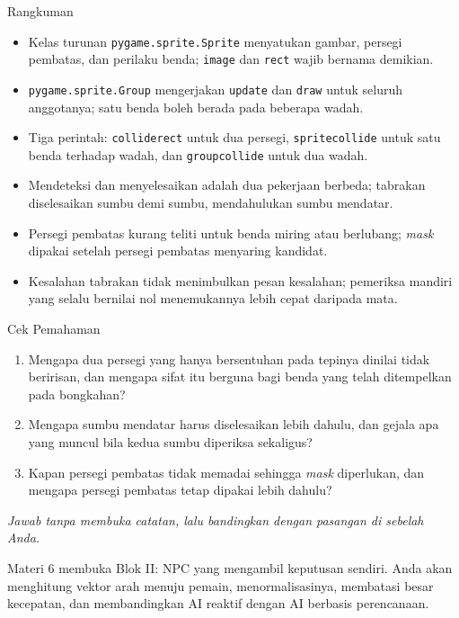 \documentclass[aspectratio=169,10pt]{beamer}
\begin{document}
\begin{frame}{Rangkuman}
\begin{itemize}
  \item Kelas turunan \texttt{pygame.sprite.Sprite} menyatukan gambar, persegi
        pembatas, dan perilaku benda; \texttt{image} dan \texttt{rect} wajib
        bernama demikian.
  \item \texttt{pygame.sprite.Group} mengerjakan \texttt{update} dan
        \texttt{draw} untuk seluruh anggotanya; satu benda boleh berada pada
        beberapa wadah.
  \item Tiga perintah: \texttt{colliderect} untuk dua persegi,
        \texttt{spritecollide} untuk satu benda terhadap wadah, dan
        \texttt{groupcollide} untuk dua wadah.
  \item Mendeteksi dan menyelesaikan adalah dua pekerjaan berbeda; tabrakan
        diselesaikan sumbu demi sumbu, mendahulukan sumbu mendatar.
  \item Persegi pembatas kurang teliti untuk benda miring atau berlubang;
        \emph{mask} dipakai setelah persegi pembatas menyaring kandidat.
  \item Kesalahan tabrakan tidak menimbulkan pesan kesalahan; pemeriksa mandiri
        yang selalu bernilai nol menemukannya lebih cepat daripada mata.
\end{itemize}
\end{frame}

\begin{frame}{Cek Pemahaman}
\begin{enumerate}
  \item Mengapa dua persegi yang hanya bersentuhan pada tepinya dinilai tidak
        beririsan, dan mengapa sifat itu berguna bagi benda yang telah
        ditempelkan pada bongkahan?
  \item Mengapa sumbu mendatar harus diselesaikan lebih dahulu, dan gejala apa
       yang muncul bila kedua sumbu diperiksa sekaligus?
  \item Kapan persegi pembatas tidak memadai sehingga \emph{mask} diperlukan,
        dan mengapa persegi pembatas tetap dipakai lebih dahulu?
\end{enumerate}
\vspace{0.35cm}
{\footnotesize\color{ubMuted}\itshape Jawab tanpa membuka catatan, lalu
bandingkan dengan pasangan di sebelah Anda.}
\end{frame}

  {Materi 6 membuka Blok II: NPC yang mengambil keputusan sendiri. Anda akan
   menghitung vektor arah menuju pemain, menormalisasinya, membatasi besar
   kecepatan, dan membandingkan AI reaktif dengan AI berbasis perencanaan.}
\end{document}
